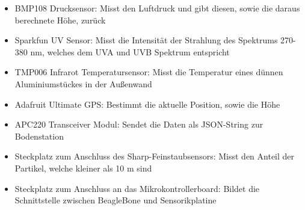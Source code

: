 \begin{itemize}
	\item BMP108 Drucksensor: Misst den Luftdruck und gibt diesen, sowie die daraus berechnete Höhe, zurück
	\item Sparkfun UV Sensor: Misst die Intensität der Strahlung des Spektrums 270-380 nm, welches dem UVA und UVB Spektrum entspricht
	\item TMP006 Infrarot Temperatursensor: Misst die Temperatur eines dünnen Aluminiumstückes in der Außenwand 
	\item Adafruit Ultimate GPS: Bestimmt die aktuelle Position, sowie die Höhe
	\item APC220 Transceiver Modul: Sendet die Daten als JSON-String zur Bodenstation
	\item Steckplatz zum Anschluss des Sharp-Feinstaubsensors: Misst den Anteil der Partikel, welche kleiner als 10 \textmu m sind
	\item Steckplatz zum Anschluss an das Mikrokontrollerboard: Bildet die Schnittstelle zwischen BeagleBone und Sensorikplatine
\end{itemize}

